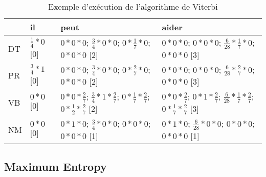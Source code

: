 \documentclass{KBook}
\begin{document}
\begin{table}[ht]
	\centering\footnotesize%
	\begin{tabular}{llll}
		\cline{2-4}\noalign{\vskip\doublerulesep
			\vskip-\arrayrulewidth}\cline{2-4}
		& il & peut & aider \\
		\hline
		DT  & $\frac{1}{4} * 0$ [0]& $0 * 0 * 0$; $\frac{3}{4} * 0 * 0$; $0 * \frac{1}{7} * 0$; $0 * 0 * 0$ [2] & $0 * 0 * 0$; $0 * 0 * 0$; $\frac{6}{28} * \frac{1}{7} * 0$; $0 * 0 * 0$ [3]\\
		PR & $\frac{3}{4} * 1$ [0]&  $0 * 0 * 0$; $\frac{3}{4} * 0 * 0$; $0 * \frac{2}{7} * 0$; $0 * 0 * 0$ [2]&  $0 * 0 * 0$; $0 * 0 * 0$; $\frac{6}{28} * \frac{2}{7} * 0$; $0 * 0 * 0$ [3]\\
		VB & $0 * 0$ [0]& $0 * 0 * \frac{2}{7}$; $\frac{3}{4} * 1 * \frac{2}{7}$; $0 * \frac{1}{7} * \frac{2}{7}$; $0 * \frac{1}{2} * \frac{2}{7}$ [2]& $0 * 0 * \frac{2}{7}$; $0 * 1 * \frac{2}{7}$; $\frac{6}{28} * \frac{1}{7} * \frac{2}{7}$; $0 * \frac{1}{7} * \frac{2}{7}$ [3]\\
		NM & $0 * 0$ [0]& $0 * 1 * 0$; $\frac{3}{4} * 0 * 0$; $0 * 0 * 0$; $0 * 0 * 0$ [1]& $0 * 1 * 0$; $\frac{6}{28} * 0 * 0$; $0 * 0 * 0$; $0 * 0 * 0$ [1]\\
		\hline\hline
	\end{tabular}
	\caption[Exemple d'exécution de l'algorithme de Viterbi]{Exemple d'exécution de l'algorithme de Viterbi \label{tab:hmm-viterbi-exp}}
\end{table}


\subsection{Maximum Entropy}
\end{document}
